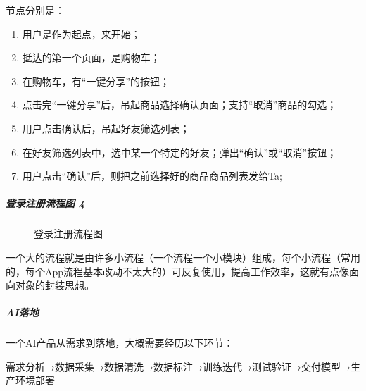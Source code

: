 \documentclass[letterpaper,11pt,english]{sphinxmanual}
\begin{document}
节点分别是：
%
\begin{footnote}[199]\sphinxAtStartFootnote
{}
%
\end{footnote}
\begin{enumerate}
%
\item {} 
用户是作为起点，来开始；

\item {} 
抵达的第一个页面，是购物车；

\item {} 
在购物车，有“一键分享”的按钮；

\item {} 
点击完“一键分享”后，吊起商品选择确认页面；支持“取消”商品的勾选；

\item {} 
用户点击确认后，吊起好友筛选列表；

\item {} 
在好友筛选列表中，选中某一个特定的好友；弹出“确认”或“取消”按钮；

\item {} 
用户点击“确认”后，则把之前选择好的商品商品列表发给Ta;

\end{enumerate}


\subparagraph{登录注册流程图 4\sphinxfootnotemark[200]}
\label{\detokenize{chapter_skill/flow_chart:id14}}%
\begin{footnotetext}[200]\sphinxAtStartFootnote
{}
%
\end{footnotetext}\ignorespaces 
\begin{figure}[H]
\centering
\capstart

\noindent{}
\caption{登录注册流程图}\label{\detokenize{chapter_skill/flow_chart:id20}}\end{figure}

一个大的流程就是由许多小流程（一个流程一个小模块）组成，每个小流程（常用的，每个App流程基本改动不太大的）可反复使用，提高工作效率，这就有点像面向对象的封装思想。


\subparagraph{AI落地}
\label{\detokenize{chapter_skill/flow_chart:ai}}
一个AI产品从需求到落地，大概需要经历以下环节：

需求分析→数据采集→数据清洗→数据标注→训练迭代→测试验证→交付模型→生产环境部署
\end{document}

